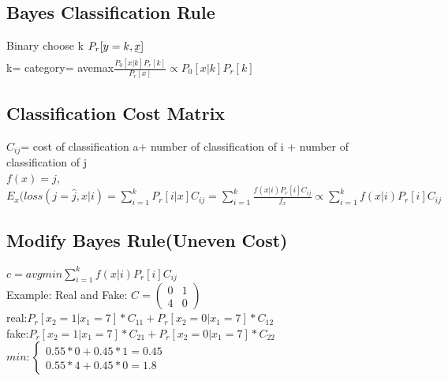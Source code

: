 \documentclass{article}
\begin{document}
\subsection{Bayes Classification Rule} 	
Binary choose k $P_r[y=k, \uwave{x}]$
\\k= category= avemax$\frac{P_0[x|k]P_r[k]}{P_r[x]} \propto P_0[x|k]P_r[k]$

\subsection{Classification Cost Matrix} 
$C_{ij}$= cost of classification a+ number of classification of i + number of classification of j
\\$f(x)=j$, $E_x(loss(j=\hat{j},x|i)= \sum_{i=1}^{k}P_r[i|x]C_{ij}= \sum_{i=1}^{k}\frac{f(x|i)P_r[i]C_{ij}}{f_x} \propto \sum_{i=1}^{k}f(x|i)P_r[i]C_{ij}$

\subsection{Modify Bayes Rule(Uneven Cost)} 
$c= avgmin\sum_{i=1}^{k}f(x|i)P_r[i]C_{ij}$
\\Example: Real and Fake: $C=\begin{pmatrix} 0 & 1 \\ 4 & 0 \end{pmatrix}$
\\real:$P_r[x_2=1|x_1=7]*C_{11}+P_r[x_2=0|x_1=7]*C_{12}$
\\fake:$P_r[x_2=1|x_1=7]*C_{21}+P_r[x_2=0|x_1=7]*C_{22}$
\\$min:\begin{cases} 0.55*0+0.45*1=0.45 \\ 
	0.55*4+0.45*0=1.8 \end{cases}$




\end{document}
